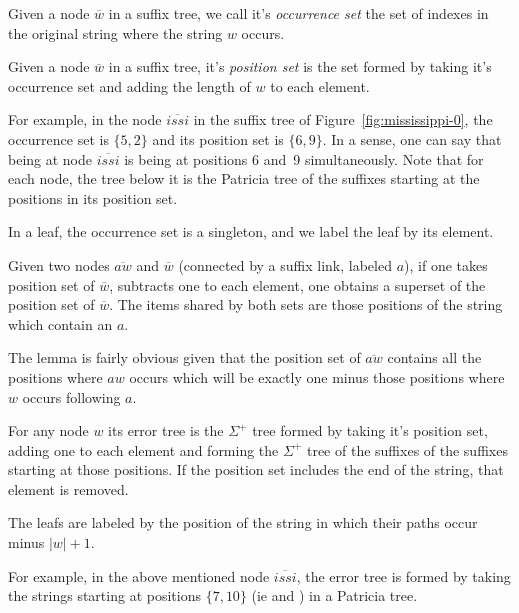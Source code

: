 \begin{definition}
Given a node $\overline{w}$ in a suffix tree, we call it's \emph{occurrence set} the set of indexes in the original string where the string $w$ occurs.
\end{definition}

\begin{definition}
Given a node $\overline{w}$ in a suffix tree, it's \emph{position set} is the set formed by taking it's occurrence set and adding the length of $w$ to each element.
\end{definition}

For example, in the node $\overline{issi}$ in the suffix tree of Figure~\ref{fig:mississippi-0}, the occurrence set is $\{5, 2\}$ and its position set is $\{6, 9\}$. In a sense, one can say that being at node $\overline{issi}$ is being at positions 6 and~9 simultaneously. Note that for each node, the tree below it is the Patricia tree of the suffixes starting at the positions in its position set.

In a leaf, the occurrence set is a singleton, and we label the leaf by its element.

\begin{lemma}\label{lemma:suffix-error}
Given two nodes $\overline{aw}$ and $\overline{w}$ (connected by a suffix link, labeled $a$), if one takes position set of $\overline{w}$, subtracts one to each element, one obtains a superset of the position set of $\overline{w}$. The items shared by both sets are those positions of the string which contain an $a$.
\end{lemma}

The lemma is fairly obvious given that the position set of $\overline{aw}$ contains all the positions where $aw$ occurs which will be exactly one minus those positions where $w$ occurs following $a$.

\begin{definition}
For any node $w$ its error tree is the $\Sigma^+$ tree formed by taking it's position set, adding one to each element and forming the $\Sigma^+$ tree of the suffixes of the suffixes starting at those positions. If the position set includes the end of the string, that element is removed.

The leafs are labeled by the position of the string in which their paths occur minus $|w| + 1$.
\end{definition}

For example, in the above mentioned node $\overline{issi}$, the error tree is formed by taking the strings starting at positions $\{7, 10\}$ (ie  and ) in a Patricia tree.

